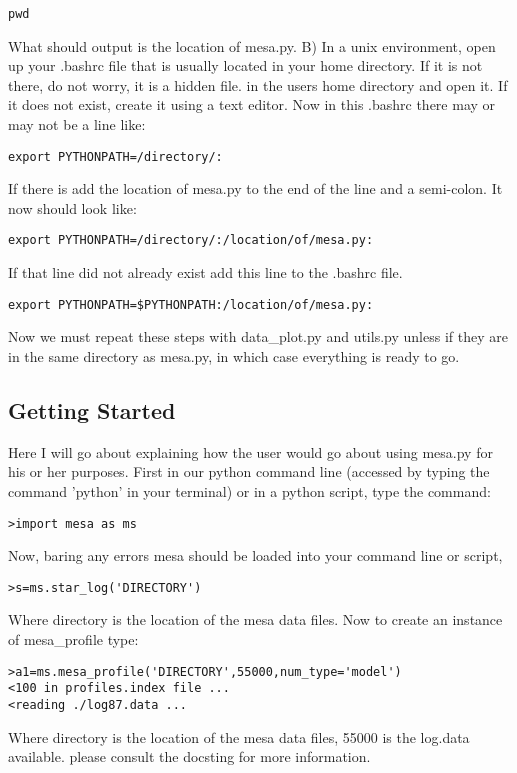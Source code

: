 \begin{verbatim}
pwd
\end{verbatim}

What should output is the location of mesa.py.
\newline
B) In a unix environment, open up your .bashrc file that is usually located in your home directory.  If it is not there, do not worry, it is a hidden file.
in the users home directory and open it.  If it does not exist, create it using a text editor.
Now in this .bashrc there may or may not be a line like:

\begin{verbatim}
export PYTHONPATH=/directory/:
\end{verbatim}

If there is add the location of mesa.py to the end of the line and a semi-colon.  It now should look like:

\begin{verbatim}
export PYTHONPATH=/directory/:/location/of/mesa.py:
\end{verbatim}

If that line did not already exist add this line to the .bashrc file.

\begin{verbatim}
export PYTHONPATH=$PYTHONPATH:/location/of/mesa.py:
\end{verbatim}

Now we must repeat these steps with data\_plot.py and utils.py unless if they are in the same directory as mesa.py, in which case everything is ready to go.


\subsection{Getting Started}
Here I will go about explaining how the user would go about using mesa.py for his or her purposes.
First in our python command line (accessed by typing the command 'python' in your terminal) or in a python script,
type the command:
\begin{verbatim}
>import mesa as ms
\end{verbatim}
Now, baring any errors mesa should be loaded into your command line or script, 
\begin{verbatim}
>s=ms.star_log('DIRECTORY')
\end{verbatim}
Where directory is the location of the mesa data files.
Now to create an instance of mesa_profile type:
\begin{verbatim}
>a1=ms.mesa_profile('DIRECTORY',55000,num_type='model')
<100 in profiles.index file ...
<reading ./log87.data ...
\end{verbatim}
Where directory is the location of the mesa data files, 55000 is the log.data available. please consult the docsting for more information.
